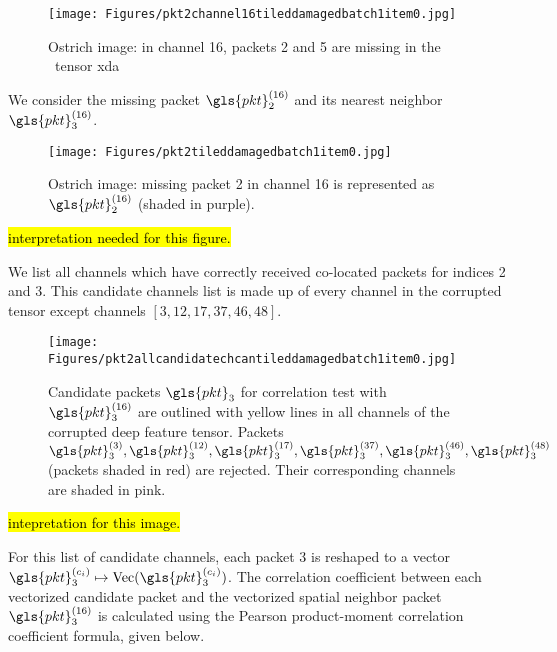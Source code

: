 \begin{figure}[H]
	\centering
	\texttt{[image: Figures/pkt2channel16tileddamagedbatch1item0.jpg]}
	\caption[Ostrich damaged tensor visualization indicating damaged channel]{Ostrich image: in channel 16, packets 2 and 5 are missing in the \addone~tensor \gls{xda}}
	\label{fig:tensorviz:ostrich:pkt2}
\end{figure}

We consider the missing packet $\gls{pkt}_2^{(16)}$ and its nearest neighbor $\gls{pkt}_3^{(16)}$. 

\begin{figure}[H]
	\centering
	\texttt{[image: Figures/pkt2tileddamagedbatch1item0.jpg]}
	\caption[Ostrich damaged tensor visualization: packet 2 in channel 16 is missing]{Ostrich image: missing packet 2 in channel 16 is represented as $\gls{pkt}_2^{(16)}$ (shaded in purple).}
	\label{fig:tensorviz:ostrich:pkt2p}
\end{figure}

\hl{interpretation needed for this figure.}

We list all channels which have correctly received co-located packets for indices 2 and 3. This candidate channels list is made up of every channel in the corrupted tensor except channels $[3,12,17,37,46,48]$. 

\begin{figure}[H]
	\centering
	\texttt{[image: Figures/pkt2allcandidatechcantileddamagedbatch1item0.jpg]}
	\caption[Candidate packets three for correlation test]{Candidate packets $\gls{pkt}_3$ for correlation test with $\gls{pkt}_3^{(16)}$ are outlined with yellow lines in all channels of the corrupted deep feature tensor. Packets $\gls{pkt}_3^{(3)},\gls{pkt}_3^{(12)},\gls{pkt}_3^{(17)},\gls{pkt}_3^{(37)},\gls{pkt}_3^{(46)},\gls{pkt}_3^{(48)}$ (packets shaded in red) are rejected. Their corresponding channels are shaded in pink.}
	\label{fig:tensorviz:ostrich:candi}
\end{figure}

\hl{intepretation for this image.}



For this list of candidate channels, each packet 3 is reshaped to a vector $\gls{pkt}_3^{(c_i)} \mapsto \text{Vec}(\gls{pkt}_3^{(c_i)})$. The correlation coefficient between each vectorized candidate packet and the vectorized spatial neighbor packet $\gls{pkt}_3^{(16)}$ is calculated using the Pearson product-moment correlation coefficient formula, given below.

